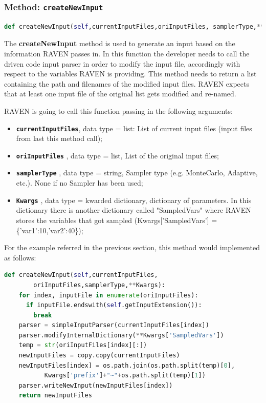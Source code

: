\subsubsection{Method: \texttt{createNewInput}}
\label{subsubsec:createNewInput}
\begin{lstlisting}[language=python]
def createNewInput(self,currentInputFiles,oriInputFiles, samplerType,**Kwargs)
\end{lstlisting} 
The \textbf{createNewInput} method is used to generate an input based 
on the information RAVEN passes in. In this function the developer needs to 
call the driven code input parser in order to modify the input file, accordingly with
respect to the variables RAVEN is providing. This method needs to return a list containing 
the path and filenames of the modified input files. \nb RAVEN expects that at least one input 
file of the original list gets modified and re-named.

RAVEN is going to call this function passing in the following arguments:
\begin{itemize}
  \item \textbf{\texttt{currentInputFiles}}, data type = list: List of current 
              input files (input files from last this method call);
  \item \textbf{\texttt{oriInputFiles}} , data type = list, List of the original input files; 
  \item  \textbf{\texttt{samplerType}} , data type = string, Sampler type (e.g. MonteCarlo,
               Adaptive, etc.). \nb None if no Sampler has been used;
  \item  \textbf{\texttt{Kwargs}} , data type = kwarded dictionary, dictionary of parameters.
               In this dictionary there is another dictionary
               called "SampledVars" where RAVEN stores the 
               variables that got sampled 
               (Kwargs['SampledVars'] = \{'var1':10,'var2':40\});
\end{itemize}
For the example referred in the previous section, this method would implemented as follows:
\newline
\begin{lstlisting}[language=python]
  def createNewInput(self,currentInputFiles,
        oriInputFiles,samplerType,**Kwargs):
    for index, inputFile in enumerate(oriInputFiles):
      if inputFile.endswith(self.getInputExtension()):
        break
    parser = simpleInputParser(currentInputFiles[index])
    parser.modifyInternalDictionary(**Kwargs['SampledVars'])
    temp = str(oriInputFiles[index][:])
    newInputFiles = copy.copy(currentInputFiles)
    newInputFiles[index] = os.path.join(os.path.split(temp)[0],
           Kwargs['prefix']+"~"+os.path.split(temp)[1])
    parser.writeNewInput(newInputFiles[index])
    return newInputFiles
\end{lstlisting} 


